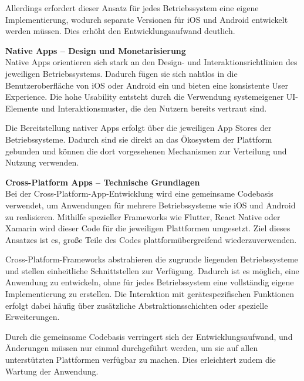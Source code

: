 Allerdings erfordert dieser Ansatz für jedes Betriebssystem eine eigene Implementierung, wodurch separate Versionen für iOS und Android entwickelt werden müssen. Dies erhöht den Entwicklungsaufwand deutlich. \cite{Denvo_Native_vs_Crossplattform} \cite{ITPortal_Native_vs_Crossplattform} \cite{knguru_crossplatform}

\vspace{0.5em}
\textbf{Native Apps – Design und Monetarisierung}\\
Native Apps orientieren sich stark an den Design- und Interaktionsrichtlinien des jeweiligen Betriebssystems. Dadurch fügen sie sich nahtlos in die Benutzeroberfläche von iOS oder Android ein und bieten eine konsistente User Experience. Die hohe Usability entsteht durch die Verwendung systemeigener UI-Elemente und Interaktionsmuster, die den Nutzern bereits vertraut sind.

Die Bereitstellung nativer Apps erfolgt über die jeweiligen App Stores der Betriebssysteme. Dadurch sind sie direkt an das Ökosystem der Plattform gebunden und können die dort vorgesehenen Mechanismen zur Verteilung und Nutzung verwenden. \cite{Denvo_Native_vs_Crossplattform} \cite{ITPortal_Native_vs_Crossplattform} \cite{knguru_crossplatform}

\vspace{0.5em}
\textbf{Cross-Platform Apps – Technische Grundlagen}\\
Bei der Cross-Platform-App-Entwicklung wird eine gemeinsame Codebasis verwendet, um Anwendungen für mehrere Betriebssysteme wie iOS und Android zu realisieren. Mithilfe spezieller Frameworks wie Flutter, React Native oder Xamarin wird dieser Code für die jeweiligen Plattformen umgesetzt. Ziel dieses Ansatzes ist es, große Teile des Codes plattformübergreifend wiederzuverwenden.

Cross-Platform-Frameworks abstrahieren die zugrunde liegenden Betriebssysteme und stellen einheitliche Schnittstellen zur Verfügung. Dadurch ist es möglich, eine Anwendung zu entwickeln, ohne für jedes Betriebssystem eine vollständig eigene Implementierung zu erstellen. Die Interaktion mit gerätespezifischen Funktionen erfolgt dabei häufig über zusätzliche Abstraktionsschichten oder spezielle Erweiterungen.

Durch die gemeinsame Codebasis verringert sich der Entwicklungsaufwand, und Änderungen müssen nur einmal durchgeführt werden, um sie auf allen unterstützten Plattformen verfügbar zu machen. Dies erleichtert zudem die Wartung der Anwendung. \cite{Denvo_Native_vs_Crossplattform} \cite{ITPortal_Native_vs_Crossplattform} \cite{knguru_crossplatform}

